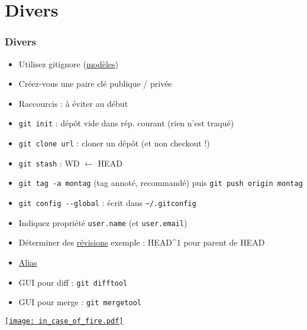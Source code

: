 \documentclass[english, french]{beamer}
\begin{document}
\section{Divers}
\begin{frame}
	\frametitle{Divers}
	\vspace{-1pt}
	\begin{itemize}
		\item Utilisez gitignore {\tiny (\href{https://github.com/github/gitignore}{modèles})}
		\item Créez-vous une paire clé publique / privée
		\item Raccourcis : à éviter au début
		\item \texttt{git init} : dépôt vide dans rép. courant (rien n’est traqué)
		\item \texttt{git clone url} : cloner un dépôt (et non checkout !)
		\item \texttt{git stash} : WD $←$ HEAD
		\item \texttt{git tag -a montag} {\tiny (tag annoté, recommandé)} puis \texttt{git push origin montag}
		\item \texttt{git config -{}-global} : écrit dans \texttt{\textasciitilde/.gitconfig}
		\item Indiquez propriété \texttt{user.name} (et \texttt{user.email})
		\item Déterminer des \href{https://git-scm.com/book/en/v2/Git-Tools-Revision-Selection}{révisions} {\tiny exemple : HEAD\textasciicircum 1 pour parent de HEAD}
		\item \href{https://git-scm.com/book/en/v2/Git-Basics-Git-Aliases}{Alias}
		\item GUI pour diff : \texttt{git difftool}
		\item GUI pour merge : \texttt{git mergetool}
	\end{itemize}
\end{frame}

\begin{frame}
	\href{https://github.com/louim/in-case-of-fire}{\texttt{[image: in\_case\_of\_fire.pdf]}}
\end{frame}

\appendix
\AtBeginSection{
}
\end{document}

